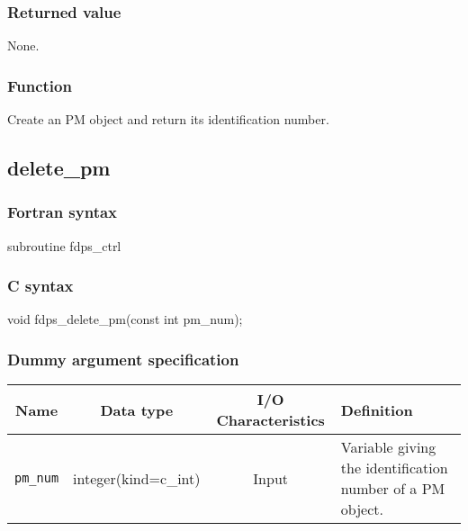 \subsubsection*{Returned value}
None.

\subsubsection*{Function}
Create an PM object and return its identification number.

\clearpage

\subsection{delete\_pm}
\subsubsection*{Fortran syntax}
\begin{screen}
\begin{spverbatim}
subroutine fdps_ctrl%
\end{spverbatim}
\end{screen}

\subsubsection*{C syntax}
\begin{screen}
\begin{spverbatim}
void fdps_delete_pm(const int pm_num);
\end{spverbatim}
\end{screen}

\subsubsection*{Dummy argument specification}
\begin{table}[h]
\begin{tabularx}{\linewidth}{cccX}
\toprule
\rowcolor{Snow2}
Name & Data type & I/O Characteristics & Definition \\
\midrule
\texttt{pm\_num} & integer(kind=c\_int) & Input & Variable giving the  identification number of a PM object. \\
\bottomrule
\end{tabularx}
\end{table}

